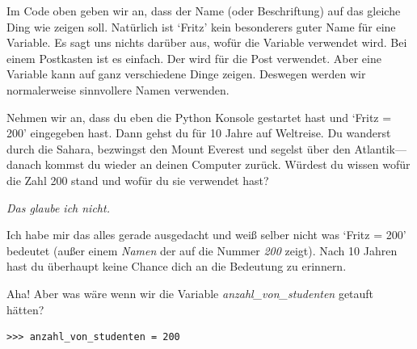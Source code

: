 Im Code oben geben wir an, dass der Name (oder Beschriftung)  auf das gleiche Ding wie  zeigen soll.
Natürlich ist `Fritz' kein besonderers guter Name für eine Variable. Es sagt uns nichts darüber aus, wofür die Variable verwendet wird. Bei einem Postkasten ist es einfach. Der wird für die Post verwendet. Aber eine Variable kann auf ganz verschiedene Dinge zeigen. Deswegen werden wir normalerweise sinnvollere Namen verwenden.
\par
Nehmen wir an, dass du eben die Python Konsole gestartet hast und `Fritz = 200' eingegeben hast. Dann gehst du für 10 Jahre auf Weltreise. Du wanderst durch die Sahara, bezwingst den Mount Everest und segelst über den Atlantik---danach kommst du wieder an deinen Computer zurück. Würdest du wissen wofür die Zahl 200 stand und wofür du sie verwendet hast?

\noindent
\emph{Das glaube ich nicht.}

\noindent
Ich habe mir das alles gerade ausgedacht und weiß selber nicht was `Fritz = 200' bedeutet (außer einem \emph{Namen} der auf die Nummer \emph{200} zeigt). Nach 10 Jahren hast du überhaupt keine Chance dich an die Bedeutung zu erinnern.
\par
Aha! Aber was wäre wenn wir die Variable \emph{anzahl\_von\_studenten} getauft hätten?

\begin{Verbatim}[frame=single]
>>> anzahl_von_studenten = 200
\end{Verbatim}

